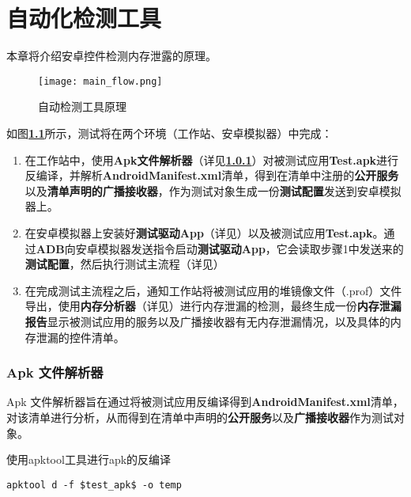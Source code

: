 
\chapter{自动化检测工具}\label{chapter_system}

本章将介绍安卓控件检测内存泄露的原理。
\begin{figure}[htbp]
	\centering
	\texttt{[image: main\_flow.png]} %
	\caption{自动检测工具原理}
	\label{fig:flow}
\end{figure}

如图\textbf{\textcolor{red}{\ref{fig:flow}}}所示，测试将在两个环境（工作站、安卓模拟器）中完成：
\begin{enumerate}
	\item 在工作站中，使用\textbf{Apk文件解析器}（详见\textbf{\textcolor{red}{\ref{apk analyser}}}）对被测试应用\textbf{Test.apk}进行反编译，并解析\textbf{AndroidManifest.xml}清单，得到在清单中注册的\textbf{公开服务}以及\textbf{清单声明的广播接收器}，作为测试对象生成一份\textbf{测试配置}发送到安卓模拟器上。
	\item 在安卓模拟器上安装好\textbf{测试驱动App}（详见\redbf{\ref{test driver app}}）以及被测试应用\textbf{Test.apk}。通过\textbf{ADB}向安卓模拟器发送指令启动\textbf{测试驱动App}，它会读取步骤1中发送来的\textbf{测试配置}，然后执行测试主流程（详见\redbf{\ref{main flow}}）
	\item 在完成测试主流程之后，通知工作站将被测试应用的堆镜像文件（.prof）文件导出，使用\textbf{内存分析器}（详见\redbf{\ref{memory analyser}}）进行内存泄漏的检测，最终生成一份\textbf{内存泄漏报告}显示被测试应用的服务以及广播接收器有无内存泄漏情况，以及具体的内存泄漏的控件清单。
\end{enumerate}

\subsection{Apk 文件解析器}\label{apk analyser}
Apk 文件解析器旨在通过将被测试应用反编译得到\textbf{AndroidManifest.xml}清单，对该清单进行分析，从而得到在清单中声明的\textbf{公开服务}以及\textbf{广播接收器}作为测试对象。
\begin{listing}[htbp]
	\centering
	\caption{使用apktool工具进行apk的反编译}
	\begin{verbatim}
apktool d -f $test_apk$ -o temp
	\end{verbatim}
	\label{shell:apktool}
\end{listing}

